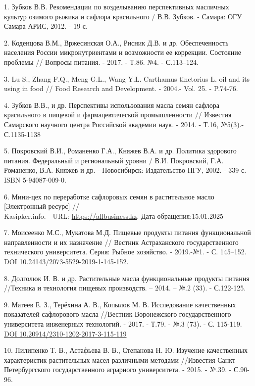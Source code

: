 \begin{references}
1. Зубков В.В. Рекомендации по возделыванию перспективных масличных
культур озимого рыжика и сафлора красильного / В.В. Зубков. - Самара:
ОГУ Самара АРИС, 2012. - 19 с.

2. Коденцова В.М., Вржесинская О.А., Рисник Д.В. и др. Обеспеченность
населения России микронутриентами и возможности ее коррекции. Состояние
проблемы // Вопросы питания. - 2017. - Т.86. №4. - С.113--124.

3. Lu S., Zhang F.Q., Meng G.L., Wang Y.L. Carthamus tinctorius L. oil
and its using in food // Food Research and Development. - 2004.- Vol.
25. - P.74-76.

4. Зубков В.В., и др. Перспективы использования масла семян сафлора
красильного в пищевой и фармацевтической промышленности // Известия
Самарского научного центра Российской академии наук. - 2014. - Т.16,
№5(3).- С.1135-1138

5. Покровский В.И., Романенко Г.А., Княжев В.А. и др. Политика здорового
питания. Федеральный и региональный уровни / В.И. Покровский, Г.А.
Романенко, В.А. Княжев и др. - Новосибирск: Издательство НГУ, 2002. -
339 с. ISBN 5-94087-009-0.

6. Мини-цех по переработке сафлоровых семян в растительное масло
{[}Электронный ресурс{]} // \\Kasipker.info. - URL:
\href{https://allbusiness.kz/mini-proizvodstvo/74-mini-ceh-po-pererabotke-saflorovyh-semyan-v-rastitelnoe-maslo.html}{https://allbusiness.kz}.-Дата
обращения:15.01.2025

7. Моисеенко М.С., Мукатова М.Д. Пищевые продукты питания функциональной
направленности и их назначение // Вестник Астраханского государственного
технического университета. Серия: Рыбное хозяйство. - 2019.-№1. - С.
145--152. DOI 10.24143/2073-5529-2019-1-145-152.

8. Долголюк И. В. и др. Растительные масла функциональные продукты
питания //Техника и технология пищевых производств. -- 2014. -- №.2
(33). - С.122-125.

9. Матеев Е. З., Терёхина А. В., Копылов М. В. Исследование качественных
показателей сафлорового масла //Вестник Воронежского государственного
университета инженерных технологий. - 2017. - Т.79. - №.3 (73). - С.
115-119. \href{https://doi.org/10.20914/2310-1202-2017-3-115-119}{DOI
10.20914/2310-1202-2017-3-115-119}

10. Пилипенко Т. В., Астафьева В. В., Степанова Н. Ю. Изучение
качественных характеристик растительных масел различными методами
//Известия Санкт-Петербургского государственного аграрного университета.
- 2015. - №.39. - С.90-96.
\end{references}

